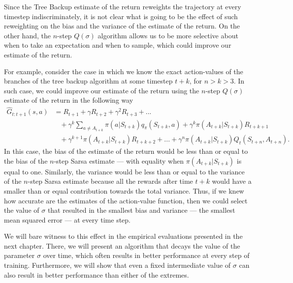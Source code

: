 Since the Tree Backup estimate of the return reweights the trajectory at every timestep indiscriminately, it is not clear what is going to be the effect of such reweighting on the bias and the variance of the estimate of the return.
On the other hand, the $n$-step $Q(\sigma)$ algorithm allows us to be more selective about when to take an expectation and when to sample, which could improve our estimate of the return.

For example, consider the case in which we know the exact action-values of the branches of the tree backup algorithm at some timestep $t + k$, for $ n > k > 3$.
In such case, we could improve our estimate of the return using the $n$-step $Q(\sigma)$ estimate of the return in the following way
\begin{align}
\label{eq:example_bias_vs_variance}
    \hat{G}_{t:t+1}(s,a) &= R_{t+1} + \gamma R_{t+2} + \gamma^2 R_{t+3} + ... 
        \nonumber \\
    & \hspace{10pt}
        + \gamma^{k} \sum_{a \neq A_{t+k}} \pi(a|S_{t+k}) q_\pi(S_{t+k}, a)
        + \gamma^{k} \pi(A_{t+k}|S_{t+k}) R_{t+k+1}
        \nonumber \\
    & \hspace{10pt}
        + \gamma^{k+1} \pi(A_{t+k}|S_{t+k}) R_{t+k+2}
        + ... 
        + \gamma^n \pi(A_{t+k}| S_{t+k}) Q_t( S_{t+n}, A_{t+n}).
        \nonumber
\end{align}
%
In this case, the bias of the estimate of the return would be less than or equal to the bias of the $n$-step Sarsa estimate --- with equality when $\pi(A_{t+k}|S_{t+k})$ is equal to one.
Similarly, the variance would be less than or equal to the variance of the $n$-step Sarsa estimate because all the rewards after time $t+k$ would have a smaller than or equal contribution towards the total variance.
Thus, if we knew how accurate are the estimates of the action-value function, then we could select the value of $\sigma$ that resulted in the smallest bias and variance --- the smallest mean squared error --- at every time step. 

We will bare witness to this effect in the empirical evaluations presented in the next chapter.
There, we will present an algorithm that decays the value of the parameter $\sigma$ over time, which often results in better performance at every step of training.
Furthermore, we will show that even a fixed intermediate value of $\sigma$ can also result in better performance than either of the extremes.




